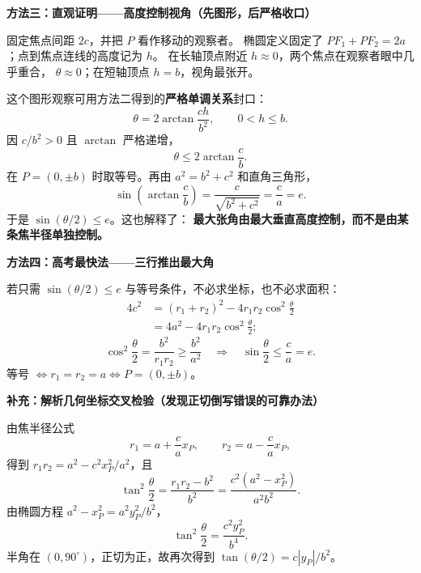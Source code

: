 \begin{proofbox}
\textbf{方法三：直观证明——高度控制视角（先图形，后严格收口）}

固定焦点间距 $2c$，并把 $P$ 看作移动的观察者。
椭圆定义固定了 $PF_1+PF_2=2a$；点到焦点连线的高度记为 $h$。
在长轴顶点附近 $h\approx0$，两个焦点在观察者眼中几乎重合，
$\theta\approx0$；在短轴顶点 $h=b$，视角最张开。

这个图形观察可用方法二得到的\textbf{严格单调关系}封口：
\[
\theta=2\arctan\frac{ch}{b^2},\qquad 0<h\le b.
\]
因 $c/b^2>0$ 且 $\arctan$ 严格递增，
\[
\theta\le2\arctan\frac cb.
\]
在 $P=(0,\pm b)$ 时取等号。再由
$a^2=b^2+c^2$ 和直角三角形，
\[
\sin\left(\arctan\frac cb\right)=\frac c{\sqrt{b^2+c^2}}=\frac ca=e.
\]
于是 $\sin(\theta/2)\le e$。这也解释了：
\textbf{最大张角由最大垂直高度控制，而不是由某条焦半径单独控制。}

\textbf{方法四：高考最快法——三行推出最大角}

若只需 $\sin(\theta/2)\le e$ 与等号条件，不必求坐标，也不必求面积：
\[
\begin{aligned}
4c^2
 &= (r_1+r_2)^2-4r_1r_2\cos^2\frac\theta2\\
 &=4a^2-4r_1r_2\cos^2\frac\theta2;
\end{aligned}
\]
\[
\boxed{\cos^2\frac\theta2=\frac{b^2}{r_1r_2}
\ge\frac{b^2}{a^2}}
\quad\Longrightarrow\quad
\boxed{\sin\frac\theta2\le\frac ca=e}.
\]
等号 $\Longleftrightarrow r_1=r_2=a
\Longleftrightarrow P=(0,\pm b)$。

\textbf{补充：解析几何坐标交叉检验（发现正切倒写错误的可靠办法）}

由焦半径公式
\[
r_1=a+\frac ca x_P,\qquad
r_2=a-\frac ca x_P,
\]
得到 $r_1r_2=a^2-c^2x_P^2/a^2$，且
\[
\tan^2\frac\theta2
=\frac{r_1r_2-b^2}{b^2}
=\frac{c^2(a^2-x_P^2)}{a^2b^2}.
\]
由椭圆方程 $a^2-x_P^2=a^2y_P^2/b^2$，
\[
\tan^2\frac\theta2=\frac{c^2y_P^2}{b^4}.
\]
半角在 $(0,90^\circ)$，正切为正，故再次得到
$\tan(\theta/2)=c|y_P|/b^2$。
\end{proofbox}
